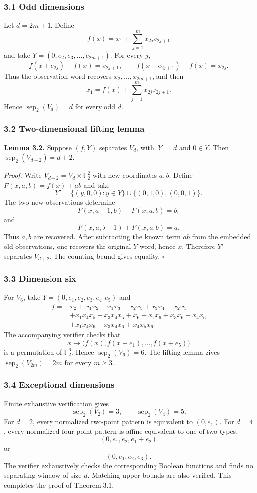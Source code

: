 \documentclass[
]{article}
\begin{document}
\subsubsection{3.1 Odd dimensions}
Let \(d=2m+1\). Define
\[
f(x)=x_1+\sum_{j=1}^{m}x_{2j}x_{2j+1}
\]
and take \(Y=(0,e_2,e_3,\ldots,e_{2m+1})\). For every \(j\),
\[
f(x+e_{2j})+f(x)=x_{2j+1},\qquad f(x+e_{2j+1})+f(x)=x_{2j}.
\]
Thus the observation word recovers \(x_2,\ldots,x_{2m+1}\), and then
\[
x_1=f(x)+\sum_{j=1}^{m}x_{2j}x_{2j+1}.
\]
Hence \(\operatorname{sep}_2(V_d)=d\) for every odd \(d\).

\subsubsection{3.2 Two-dimensional lifting lemma}
\textbf{Lemma 3.2.} Suppose \((f,Y)\) separates \(V_d\), with \(|Y|=d\) and \(0\in Y\). Then \(\operatorname{sep}_2(V_{d+2})=d+2\).

\textit{Proof.} Write \(V_{d+2}=V_d\times\mathbb F_2^2\) with new coordinates \(a,b\). Define \(F(x,a,b)=f(x)+ab\) and take
\[
Y'=\{(y,0,0):y\in Y\}\cup\{(0,1,0),(0,0,1)\}.
\]
The two new observations determine
\[
F(x,a+1,b)+F(x,a,b)=b,
\]
and
\[
F(x,a,b+1)+F(x,a,b)=a.
\]
Thus \(a,b\) are recovered. After subtracting the known term \(ab\) from the embedded old observations, one recovers the original \(Y\)-word, hence \(x\). Therefore \(Y'\) separates \(V_{d+2}\). The counting bound gives equality. \(\square\)

\subsubsection{3.3 Dimension six}
For \(V_6\), take \(Y=(0,e_1,e_2,e_3,e_4,e_5)\) and
\[
\begin{aligned}
f={}&x_2+x_1x_2+x_1x_3+x_2x_3+x_3x_4+x_2x_5\\
&+x_1x_4x_5+x_3x_4x_5+x_6+x_2x_6+x_3x_6+x_4x_6\\
&+x_1x_4x_6+x_3x_4x_6+x_4x_5x_6.
\end{aligned}
\]
The accompanying verifier checks that
\[
x\longmapsto\bigl(f(x),f(x+e_1),\ldots,f(x+e_5)\bigr)
\]
is a permutation of \(\mathbb F_2^6\). Hence \(\operatorname{sep}_2(V_6)=6\). The lifting lemma gives \(\operatorname{sep}_2(V_{2m})=2m\) for every \(m\ge3\).

\subsubsection{3.4 Exceptional dimensions}
Finite exhaustive verification gives
\[
\operatorname{sep}_2(V_2)=3,\qquad \operatorname{sep}_2(V_4)=5.
\]
For \(d=2\), every normalized two-point pattern is equivalent to \((0,e_1)\). For \(d=4\), every normalized four-point pattern is affine-equivalent to one of two types,
\[
(0,e_1,e_2,e_1+e_2)
\]
or
\[
(0,e_1,e_2,e_3).
\]
The verifier exhaustively checks the corresponding Boolean functions and finds no separating window of size \(d\). Matching upper bounds are also verified. This completes the proof of Theorem 3.1.
\end{document}
